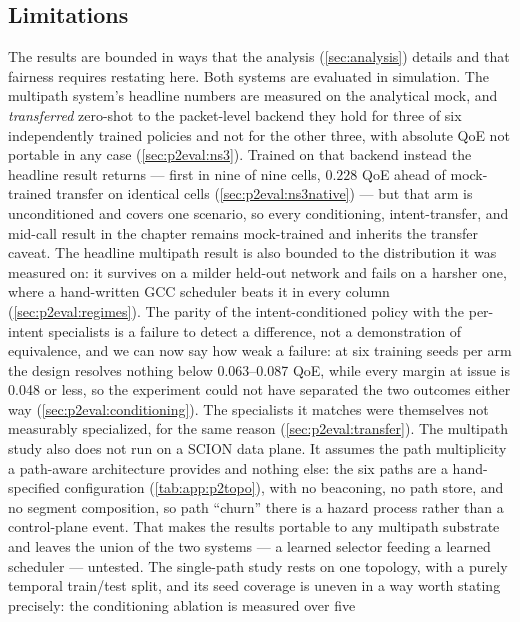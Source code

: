 \subsection{Limitations}
\label{sec:disc:limitations}

The results are bounded in ways that the analysis (\cref{sec:analysis}) details and that fairness requires
restating here. Both systems are evaluated in simulation. The multipath system's headline numbers are
measured on the analytical mock, and \emph{transferred} zero-shot to the packet-level backend they hold
for three of six independently trained policies and not for the other three, with absolute QoE not
portable in any case (\cref{sec:p2eval:ns3}). Trained on that backend instead the headline result
returns --- first in nine of nine cells, $0.228$ QoE ahead of mock-trained transfer on identical cells
(\cref{sec:p2eval:ns3native}) --- but that arm is unconditioned and covers one scenario, so every
conditioning, intent-transfer, and mid-call result in the chapter remains mock-trained and inherits the
transfer caveat. The headline multipath result is also
bounded to the distribution it was measured on: it survives on a milder held-out network and fails on a
harsher one, where a hand-written GCC scheduler beats it in every column
(\cref{sec:p2eval:regimes}). The parity of the intent-conditioned policy with the per-intent specialists is a failure to
detect a difference, not a demonstration of equivalence, and we can now say how weak a failure: at six
training seeds per arm the design resolves nothing below \SIrange{0.063}{0.087}{} QoE, while every
margin at issue is 0.048 or less, so the experiment could not have separated the two outcomes either
way (\cref{sec:p2eval:conditioning}). The specialists it matches were themselves not measurably
specialized, for the same reason (\cref{sec:p2eval:transfer}).
The multipath study also does not run on a SCION data plane. It assumes the path multiplicity a
path-aware architecture provides and nothing else: the six paths are a hand-specified configuration
(\cref{tab:app:p2topo}), with no beaconing, no path store, and no segment composition, so path
``churn'' there is a hazard process rather than a control-plane event. That makes the results portable
to any multipath substrate and leaves the union of the two systems --- a learned selector feeding a
learned scheduler --- untested.
The single-path study rests on one topology, with a purely temporal train/test split, and its seed
coverage is uneven in a way worth stating precisely: the conditioning ablation is measured over five
